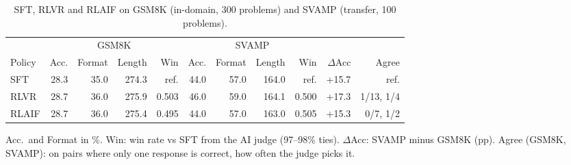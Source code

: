 \documentclass{article}
\newcommand{\tabsetup}{\footnotesize\setlength{\tabcolsep}{4pt}\renewcommand{\arraystretch}{0.95}}
\begin{document}
\label{subsubsec:results-t5-indomain}
\begin{table}[t]
\centering
\caption{SFT, RLVR and RLAIF on GSM8K (in-domain, 300 problems) and SVAMP (transfer, 100 problems).}
\label{tab:rlvr-rlaif}
\tabsetup
\begin{tabular}{lrrrrrrrrrr}
\toprule
 & \multicolumn{4}{c}{GSM8K} & \multicolumn{4}{c}{SVAMP} & & \\
\cmidrule(lr){2-5}\cmidrule(lr){6-9}
Policy & Acc. & Format & Length & Win & Acc. & Format & Length & Win & $\Delta$Acc & Agree \\
\midrule
SFT   & 28.3 & 35.0 & 274.3 & ref. & 44.0 & 57.0 & 164.0 & ref. & +15.7 & ref. \\
RLVR  & 28.7 & 36.0 & 275.9 & 0.503 & 46.0 & 59.0 & 164.1 & 0.500 & +17.3 & 1/13, 1/4 \\
RLAIF & 28.7 & 36.0 & 275.4 & 0.495 & 44.0 & 57.0 & 163.0 & 0.505 & +15.3 & 0/7, 1/2 \\
\bottomrule
\end{tabular}

\vspace{2pt}
{\footnotesize Acc.\ and Format in \%. Win: win rate vs SFT from the AI judge (97--98\% ties). $\Delta$Acc: SVAMP minus GSM8K (pp). Agree (GSM8K, SVAMP): on pairs where only one response is correct, how often the judge picks it.}
\end{table}
\end{document}
